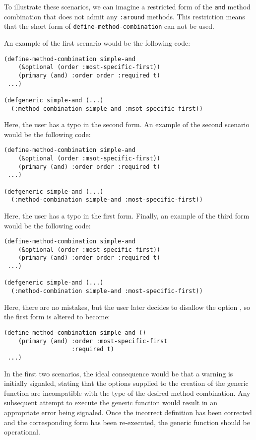 \noindent
To illustrate these scenarios, we can imagine a restricted form of the
\texttt{and} method combination that does not admit any
\texttt{:around} methods.  This restriction means that the short form
of \texttt{define-method-combination} can not be used.

An example of the first scenario would be the following code:

{\small\begin{verbatim}
(define-method-combination simple-and
    (&optional (order :most-specific-first))
    (primary (and) :order order :required t)
 ...)

(defgeneric simple-and (...)
  (:method-combination simple-and :msot-specific-first))
\end{verbatim}}

\noindent
Here, the user has a typo in the second form.
An example of the second scenario would be the following code:

{\small\begin{verbatim}
(define-method-combination simple-and
    (&optional (order :msot-specific-first))
    (primary (and) :order order :required t)
 ...)

(defgeneric simple-and (...)
  (:method-combination simple-and :most-specific-first))
\end{verbatim}}

\noindent
Here, the user has a typo in the first form.
Finally, an example of the third form would be the following code:

{\small\begin{verbatim}
(define-method-combination simple-and
    (&optional (order :most-specific-first))
    (primary (and) :order order :required t)
 ...)

(defgeneric simple-and (...)
  (:method-combination simple-and :most-specific-first))
\end{verbatim}}

\noindent
Here, there are no mistakes, but the user later decides to disallow
the option , so the first form is altered to become:

{\small\begin{verbatim}
(define-method-combination simple-and ()
    (primary (and) :order :most-specific-first
                   :required t)
 ...)
\end{verbatim}}

\noindent
In the first two scenarios, the ideal consequence would be that a
warning is initially signaled, stating that the options supplied to
the creation of the generic function are incompatible with the type of
the desired method combination.  Any subsequent attempt to execute the
generic function would result in an appropriate error being signaled.
Once the incorrect definition has been corrected and the corresponding
form has been re-executed, the generic function should be operational.

